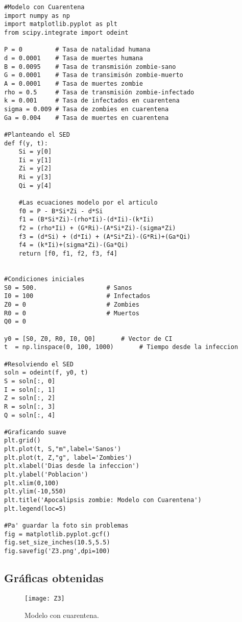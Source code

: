 \documentclass[12pt]{article}
\begin{document}
{\color{Fuchsia}\begin{verbatim}
#Modelo con Cuarentena
import numpy as np
import matplotlib.pyplot as plt
from scipy.integrate import odeint

P = 0         # Tasa de natalidad humana
d = 0.0001    # Tasa de muertes humana
B = 0.0095    # Tasa de transmisión zombie-sano
G = 0.0001    # Tasa de transimisón zombie-muerto
A = 0.0001    # Tasa de muertes zombie
rho = 0.5     # Tasa de transmisión zombie-infectado
k = 0.001     # Tasa de infectados en cuarentena
sigma = 0.009 # Tasa de zombies en cuarentena
Ga = 0.004    # Tasa de muertes en cuarentena

#Planteando el SED
def f(y, t):
    Si = y[0]
    Ii = y[1]
    Zi = y[2]
    Ri = y[3]
    Qi = y[4]
    
    #Las ecuaciones modelo por el articulo
    f0 = P - B*Si*Zi - d*Si
    f1 = (B*Si*Zi)-(rho*Ii)-(d*Ii)-(k*Ii)
    f2 = (rho*Ii) + (G*Ri)-(A*Si*Zi)-(sigma*Zi)
    f3 = (d*Si) + (d*Ii) + (A*Si*Zi)-(G*Ri)+(Ga*Qi)
    f4 = (k*Ii)+(sigma*Zi)-(Ga*Qi)
    return [f0, f1, f2, f3, f4]
  
  
#Condiciones iniciales
S0 = 500.                   # Sanos
I0 = 100                    # Infectados
Z0 = 0                      # Zombies
R0 = 0                      # Muertos
Q0 = 0

y0 = [S0, Z0, R0, I0, Q0]       # Vector de CI
t  = np.linspace(0, 100, 1000)       # Tiempo desde la infeccion

#Resolviendo el SED
soln = odeint(f, y0, t)
S = soln[:, 0]
I = soln[:, 1]
Z = soln[:, 2]
R = soln[:, 3]
Q = soln[:, 4]

#Graficando suave
plt.grid()
plt.plot(t, S,"m",label='Sanos')
plt.plot(t, Z,"g", label='Zombies')
plt.xlabel('Dias desde la infeccion')
plt.ylabel('Poblacion')
plt.xlim(0,100)
plt.ylim(-10,550)
plt.title('Apocalipsis zombie: Modelo con Cuarentena')
plt.legend(loc=5)

#Pa' guardar la foto sin problemas
fig = matplotlib.pyplot.gcf()
fig.set_size_inches(10.5,5.5)
fig.savefig('Z3.png',dpi=100)
\end{verbatim}}

\subsection*{Gráficas obtenidas}

\begin{figure}[H]
\centering
 \texttt{[image: Z3]}
 \caption{Modelo con cuarentena.}
\end{figure}
\end{document}
